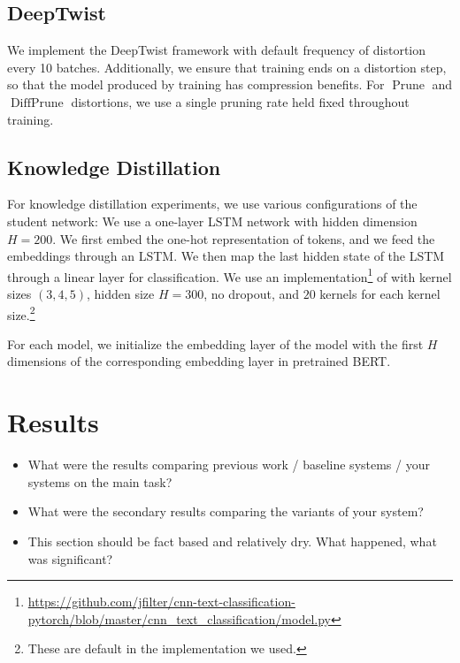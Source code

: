 \documentclass[10pt]{article}
\newcommand{\prune}{\operatorname{Prune}}
\newcommand{\diffprune}{\operatorname{DiffPrune}}
\begin{document}
\subsection{DeepTwist}
We implement the DeepTwist framework with default frequency of distortion
every 10 batches. Additionally, we ensure that training ends on a
distortion step, so that the model produced by training has compression
benefits. For $\prune$ and $\diffprune$ distortions, we use a single
pruning rate held fixed throughout training. 


\subsection{Knowledge Distillation}
For knowledge distillation experiments, we use various configurations of
the student network:
 We use a one-layer LSTM network with hidden dimension
$H=200$. We first embed the one-hot representation of tokens, and we feed
the embeddings through an LSTM. We then map the last hidden state of the
LSTM through a linear layer for classification. 
 We use an implementation\footnote{\url{https://github.com/jfilter/cnn-text-classification-pytorch/blob/master/cnn_text_classification/model.py}} 
of \citet{kim2014convolutional} with kernel sizes $(3,4,5)$, hidden size
$H=300$, no dropout, and $20$ kernels for each kernel size.\footnote{These
are default in the implementation we used.} 

For each model, we initialize the embedding layer of the model with the
first $H$ dimensions of the corresponding embedding layer in pretrained
BERT. 



\section{Results}

\begin{itemize}
\item What were the results comparing previous work / baseline systems / your systems on the main task?
\item What were the secondary results comparing the variants of your system?
\item This section should be fact based and relatively dry. What happened, what was significant?
\end{itemize}

\end{document}
